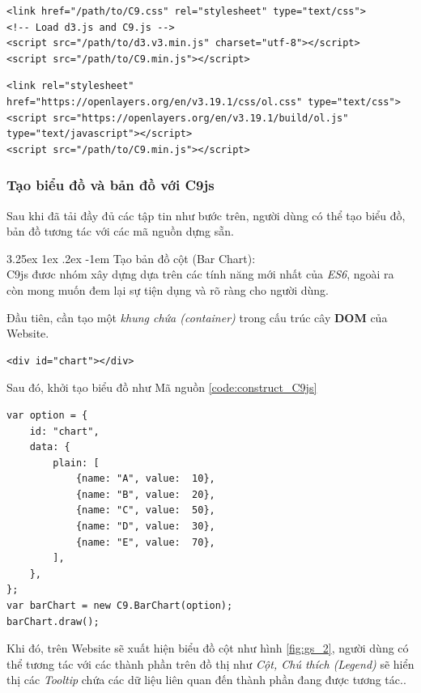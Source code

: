 \documentclass[12pt,a4paper]{article}
\makeatletter
\newcommand{\myparagraph}[1]{\paragraph{#1}\mbox{}\\} %
\renewcommand\paragraph{\@startsection{paragraph}{5}{\z@}%
  {3.25ex \@plus1ex \@minus.2ex}%
  {-1em}%
  {\normalfont\normalsize\bfseries}}
\makeatother
\begin{document}
\begin{lstlisting}[caption=Tải mã nguồn \textit{d3.js} trước tiên]
<link href="/path/to/C9.css" rel="stylesheet" type="text/css">
<!-- Load d3.js and C9.js -->
<script src="/path/to/d3.v3.min.js" charset="utf-8"></script>
<script src="/path/to/C9.min.js"></script>
\end{lstlisting}

\begin{lstlisting}[caption=Tải mã nguồn \textit{OpenLayers 3} nếu muốn sử dụng chức năng Bản đồ]
<link rel="stylesheet" href="https://openlayers.org/en/v3.19.1/css/ol.css" type="text/css">
<script src="https://openlayers.org/en/v3.19.1/build/ol.js" type="text/javascript"></script>
<script src="/path/to/C9.min.js"></script>
\end{lstlisting}

\subsubsection{Tạo biểu đồ và bản đồ với C9js}
Sau khi đã tải đầy đủ các tập tin như bước trên, người dùng có thể tạo biểu đồ, bản đồ tương tác với các mã nguồn dựng sẵn.

\myparagraph{Tạo bản đồ cột (Bar Chart):}
C9js đươc nhóm xây dựng dựa trên các tính năng mới nhất của \textit{ES6}, ngoài ra còn mong muốn đem lại sự tiện dụng và rõ ràng cho người dùng.

Đầu tiên, cần tạo một \textit{khung chứa (container)} trong cấu trúc cây \textbf{DOM} của Website.

\begin{lstlisting}[caption=Tạo \textit{container} để chứa biểu đồ]
<div id="chart"></div>
\end{lstlisting}

Sau đó, khởi tạo biểu đồ như Mã nguồn \ref{code:construct_C9js}

\begin{lstlisting}[caption=Khởi tạo biểu đồ với C9js,label={code:construct_C9js}]
var option = {
    id: "chart",
    data: {
        plain: [
            {name: "A", value:  10},
            {name: "B", value:  20},
            {name: "C", value:  50},
            {name: "D", value:  30},
            {name: "E", value:  70},
        ],
    }, 
};
var barChart = new C9.BarChart(option);
barChart.draw();
\end{lstlisting}

Khi đó, trên Website sẽ xuất hiện biểu đồ cột như hình \ref{fig:gs_2}, người dùng có thể tương tác với các thành phần trên đồ thị như \textit{Cột, Chú thích (Legend)} sẽ hiển thị các \textit{Tooltip} chứa các dữ liệu liên quan đến thành phần đang được tương tác..
\end{document}

